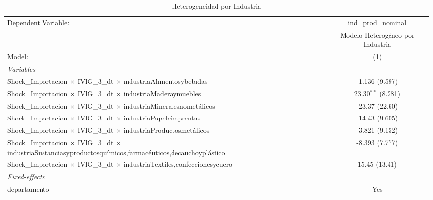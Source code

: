\documentclass[12pt]{article}
\begin{document}
\setcounter{table}{8}
\begin{table}[htbp]
\centering
\begin{threeparttable}

   \caption{Heterogeneidad por Industria}
   \centering
   \small
   \begin{tabular}{lc}
      \tabularnewline \midrule \midrule
      Dependent Variable:                                                                                                         & ind\_prod\_nominal\\    
                                                                                                                                  & Modelo Heterogéneo por Industria \\   
      Model:                                                                                                                      & (1)\\  
      \midrule
      \emph{Variables}\\
      Shock\_Importacion $\times$ IVIG\_3\_dt $\times$ industriaAlimentosybebidas                                                 & -1.136 (9.597)\\   
      Shock\_Importacion $\times$ IVIG\_3\_dt $\times$ industriaMaderaymuebles                                                    & 23.30$^{**}$ (8.281)\\   
      Shock\_Importacion $\times$ IVIG\_3\_dt $\times$ industriaMineralesnometálicos                                              & -23.37 (22.60)\\   
      Shock\_Importacion $\times$ IVIG\_3\_dt $\times$ industriaPapeleimprentas                                                   & -14.43 (9.605)\\   
      Shock\_Importacion $\times$ IVIG\_3\_dt $\times$ industriaProductosmetálicos                                                & -3.821 (9.152)\\   
      Shock\_Importacion $\times$ IVIG\_3\_dt $\times$ industriaSustanciasyproductosquímicos,farmacéuticos,decauchoyplástico      & -8.393 (7.777)\\   
      Shock\_Importacion $\times$ IVIG\_3\_dt $\times$ industriaTextiles,confeccionesycuero                                       & 15.45 (13.41)\\   
      \midrule
      \emph{Fixed-effects}\\
      departamento                                                                                                                & Yes\\  

\end{tabular}
\end{threeparttable}
\end{table}
\end{document}
